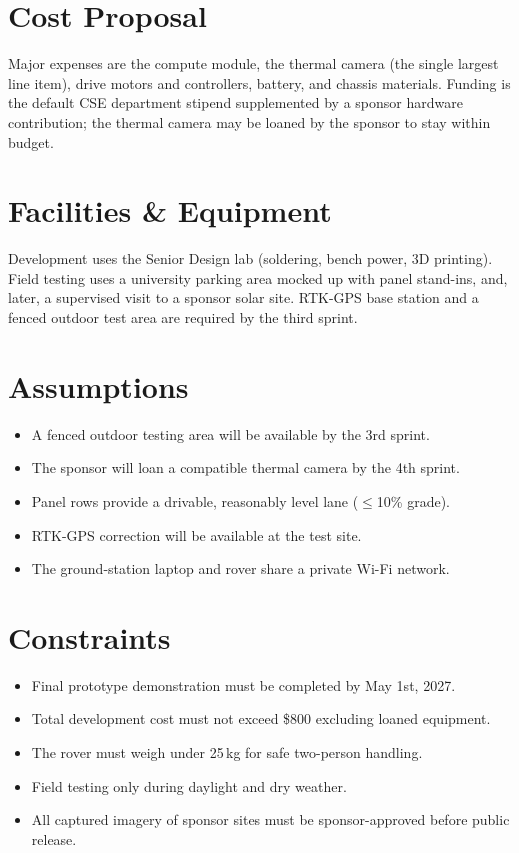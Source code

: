 \documentclass[11pt,letterpaper]{article}
\begin{document}
\section{Cost Proposal}
Major expenses are the compute module, the thermal camera (the single largest line
item), drive motors and controllers, battery, and chassis materials. Funding is
the default CSE department stipend supplemented by a sponsor hardware contribution;
the thermal camera may be loaned by the sponsor to stay within budget.

\section{Facilities \& Equipment}
Development uses the Senior Design lab (soldering, bench power, 3D printing). Field
testing uses a university parking area mocked up with panel stand-ins, and, later,
a supervised visit to a sponsor solar site. RTK-GPS base station and a fenced
outdoor test area are required by the third sprint.

\section{Assumptions}
\begin{itemize}
  \item A fenced outdoor testing area will be available by the 3rd sprint.
  \item The sponsor will loan a compatible thermal camera by the 4th sprint.
  \item Panel rows provide a drivable, reasonably level lane ($\leq$10\% grade).
  \item RTK-GPS correction will be available at the test site.
  \item The ground-station laptop and rover share a private Wi-Fi network.
\end{itemize}

\section{Constraints}
\begin{itemize}
  \item Final prototype demonstration must be completed by May 1st, 2027.
  \item Total development cost must not exceed \$800 excluding loaned equipment.
  \item The rover must weigh under 25\,kg for safe two-person handling.
  \item Field testing only during daylight and dry weather.
  \item All captured imagery of sponsor sites must be sponsor-approved before public release.
\end{itemize}
\end{document}
